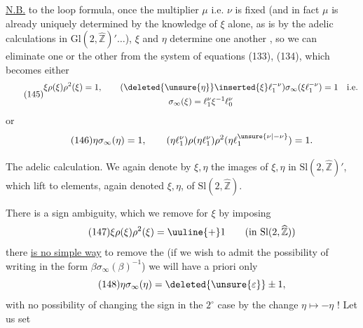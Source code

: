 \uline{N.B.}  to the loop formula, once the multiplier $\mu$ i.e. $\nu$ is fixed (and in fact $\mu$ is already uniquely determined by the knowledge of $\xi$ alone, as is  by the adelic calculations in $\mathrm{Gl}(2,\widehat{\mathbb Z})'\ldots$), $\xi$ and $\eta$ determine one another , so we can eliminate one or the other from the system of equations (133), (134), which becomes either
\[
\tag{145}
\begin{gathered}
\xi\rho(\xi)\rho^2(\xi)=1,\qquad
(\deleted{\unsure{\eta}}\inserted{\xi}\ell_1^{-\nu})\sigma_\infty(\xi\ell_1^{-\nu})=1
\quad\text{i.e.}\\
\sigma_\infty(\xi)=\ell_1^\nu\xi^{-1}\ell_0^\nu
\end{gathered}
\]
or
\[
\tag{146}
\eta\sigma_\infty(\eta)=1,\qquad
(\eta\ell_1^\nu)\rho(\eta\ell_1^\nu)\rho^2(\eta\ell_1^{\unsure{\nu|-\nu}})=1.
\]


The adelic calculation. We again denote by $\xi,\eta$ the images of $\xi,\eta$ in $\mathrm{Sl}(2,\widehat{\mathbb Z})'$, which lift to elements, again denoted $\xi,\eta$, of $\mathrm{Sl}(2,\widehat{\mathbb Z})$.

There is a sign ambiguity, which we remove for $\xi$ by imposing
\[
\tag{147}
\xi\rho(\xi)\rho^2(\xi)=\uuline{+}1
\qquad(\text{in }\mathrm{Sl}(2,\widehat{\mathbb Z}))
\]
 there \uline{is no simple way} to remove the  (if we wish to admit  the possibility of writing in the form $\beta\sigma_\infty(\beta)^{-1}$) \uline{} we will have a priori only
\[
\tag{148}
\eta\sigma_\infty(\eta)=\deleted{\unsure{\varepsilon}}\pm1,
\]
with no possibility of changing the sign in the $2^\circ$ case by the change $\eta\mapsto-\eta$ ! Let us set


